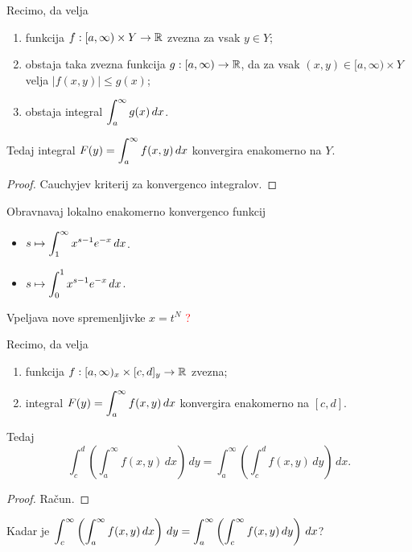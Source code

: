 \begin{trditev}
    Recimo, da velja
    \begin{enumerate}
        \item funkcija \(f:[a, \infty) \times Y \to \mathbb{R}\) zvezna za vsak $y \in Y$;
        \item obstaja taka zvezna funkcija \(g:[a, \infty) \to \mathbb{R}\), da za vsak $(x,y) \in [a, \infty) \times Y$ velja $|f(x,y)| \leq g(x)$;
        \item obstaja integral \(\displaystyle \int_{a}^{\infty} g(x) \, dx\).
    \end{enumerate}
    Tedaj integral \(\displaystyle F(y) = \int_{a}^{\infty} f(x,y) \, dx\) konvergira enakomerno na \(Y\).
\end{trditev}

\begin{proof}
    Cauchyjev kriterij za konvergenco integralov.
\end{proof}

\begin{zgled}
    Obravnavaj lokalno enakomerno konvergenco funkcij
    \begin{itemize}
        \item \(\displaystyle s \mapsto \int_{1}^{\infty} x^{s-1} e^{-x} \, dx\).
        \item \(\displaystyle s \mapsto \int_{0}^{1} x^{s-1} e^{-x} \, dx\).
    \end{itemize}

    Vpeljava nove spremenljivke $x = t^N$ \textcolor{red}{?}
\end{zgled}

\begin{trditev}
    Recimo, da velja
    \begin{enumerate}
        \item funkcija \(f:[a, \infty)_x \times [c,d]_y \to \mathbb{R}\) zvezna;
        \item integral \(\displaystyle F(y) = \int_{a}^{\infty} f(x,y) \, dx\) konvergira enakomerno na \([c,d]\).
    \end{enumerate}
    Tedaj \[\int_{c}^{d}\left(\int_{a}^{\infty} f(x,y) \, dx\right) \, dy = \int_{a}^{\infty}\left(\int_{c}^{d} f(x,y) \, dy\right) \, dx.\]
\end{trditev}

\begin{proof}
    Račun.
\end{proof}

Kadar je \(\displaystyle \int_{c}^{\infty}\left(\int_{a}^{\infty} f(x,y) \, dx\right) \, dy = \int_{a}^{\infty}\left(\int_{c}^{\infty} f(x,y) \, dy\right) \, dx\)?

